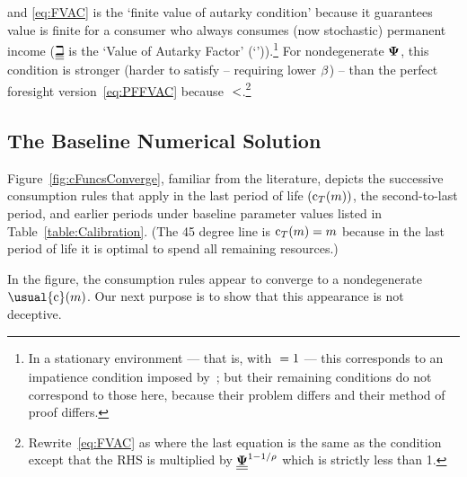 \documentclass[BufferStockTheory]{subfiles}
\begin{document}
{\noindent}and \eqref{eq:FVAC} is the `finite value of autarky condition' because it guarantees value is finite for a consumer who always consumes (now stochastic) permanent income (${\underline{\underline{\beth}}}$ is the `Value of Autarky Factor' (`{\VAFacDefn}')).\footnote{In a stationary environment --- that is, with $\underline{\underline{}}=1$ --- this corresponds to an impatience condition imposed by~\cite{mstIncFluct}; but their remaining conditions do not correspond to those here, because their problem differs and their method of proof differs.}  For nondegenerate $\mathbf{\Psi}$, this condition is stronger (harder to satisfy -- requiring lower $\beta$) -- than the perfect foresight version~\eqref{eq:PFFVAC} because $\underline{\underline{}} < $.\footnote{Rewrite~\eqref{eq:FVAC} as
  where the last equation is the same as the {\PFFVAC} condition except that the
  RHS is multiplied by $\underline{\underline{\mathbf{\Psi}}}^{1-1/{\rho}}$ which is strictly less than 1.}

\hypertarget{Baseline-Numerical-Solution}{}
\subsection{The Baseline Numerical Solution}

Figure~\ref{fig:cFuncsConverge}, familiar from the literature, depicts the successive consumption rules that apply in the last period of life $(\mathrm{c}_{T}(m))$, the second-to-last period, and earlier periods under baseline parameter values listed in Table~\ref{table:Calibration}.  (The 45 degree line is $\mathrm{c}_{T}(m) = m$ because in the last period of life it is optimal to spend all remaining resources.)

In the figure, the consumption rules appear to converge to a nondegenerate $\usual{\cFunc}(\mNrm)$.  Our next purpose is to show that this appearance is not deceptive.  \hypertarget{Concave-Consumption-Function-Characteristics}{}

\hypertarget{Symbols}{}


\renewcommand{\figName}{Convergence-of-the-Consumption-Rules} 
\renewcommand{\figFile}{cFuncsConverge} 
\end{document}
